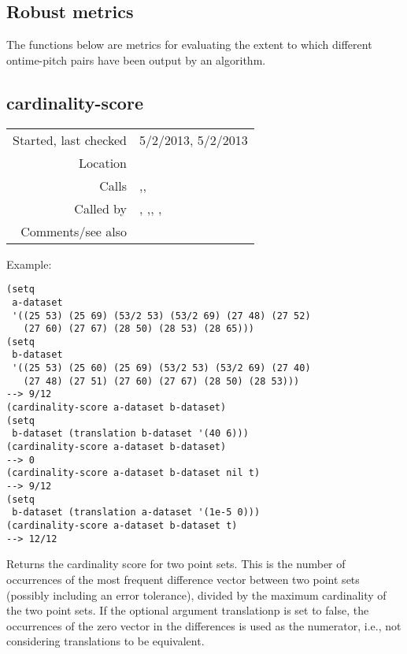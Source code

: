 \subsection{Robust metrics}\label{sec:robust-metrics}

The functions below are metrics for
evaluating the extent to which different ontime-pitch
pairs have been output by an algorithm.


\subsection*{cardinality-score}\label{fun:cardinality-score}

\vspace{0.3cm}
\begin{tabular}{r|p{8cm}}
Started, last checked & 5/2/2013, 5/2/2013 \\
Location & \nameref{sec:robust-metrics} \\
Calls & \nameref{fun:constant-vector},\newline \nameref{fun:most-frequent-difference-vector}, \nameref{fun:max-item} \\
Called by & \nameref{fun:establishment-matrix}, \nameref{fun:establishment-metric},\newline \nameref{fun:matching-score}, \nameref{fun:occurrence-matrixnrel-idx},\newline \nameref{fun:occurrence-metric} \\
Comments/see also &
\end{tabular}

\vspace{0.5cm}
\noindent Example:
\begin{verbatim}
(setq
 a-dataset
 '((25 53) (25 69) (53/2 53) (53/2 69) (27 48) (27 52)
   (27 60) (27 67) (28 50) (28 53) (28 65)))
(setq
 b-dataset
 '((25 53) (25 60) (25 69) (53/2 53) (53/2 69) (27 40)
   (27 48) (27 51) (27 60) (27 67) (28 50) (28 53)))
--> 9/12
(cardinality-score a-dataset b-dataset)
(setq
 b-dataset (translation b-dataset '(40 6)))
(cardinality-score a-dataset b-dataset)
--> 0
(cardinality-score a-dataset b-dataset nil t)
--> 9/12
(setq
 b-dataset (translation a-dataset '(1e-5 0)))
(cardinality-score a-dataset b-dataset t)
--> 12/12
\end{verbatim}

\noindent Returns the cardinality score for two point
sets. This is the number of occurrences of the most
frequent difference vector between two point sets
(possibly including an error tolerance), divided by
the maximum cardinality of the two point sets. If the
optional argument translationp is set to false, the
occurrences of the zero vector in the differences is
used as the numerator, i.e., not considering
translations to be equivalent.


